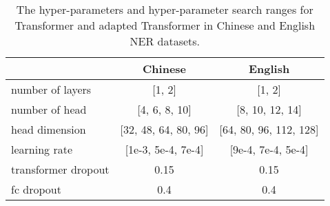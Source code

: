 \documentclass[11pt,a4paper]{article}
\begin{document}
\begin{table}[]\small \setlength{\tabcolsep}{3pt}
  \centering
  \begin{tabular}{lcc} \toprule
                      & Chinese                 & English                  \\ \midrule
  number of layers    & [1, 2]                  & [1, 2]                   \\
  number of head      & [4, 6, 8, 10]           & [8, 10, 12, 14]          \\
  head dimension      & [32, 48, 64, 80, 96]    & [64, 80, 96, 112, 128]   \\
  learning rate       & [1e-3, 5e-4, 7e-4] & [9e-4, 7e-4, 5e-4] \\
  transformer dropout & 0.15                    & 0.15                     \\
  fc dropout          & 0.4                     & 0.4 \\ \bottomrule
  \end{tabular}
  \caption{The hyper-parameters and hyper-parameter search ranges for Transformer and adapted Transformer in Chinese and English NER datasets.} \label{tb:rel-transformer}
\end{table}
\end{document}
